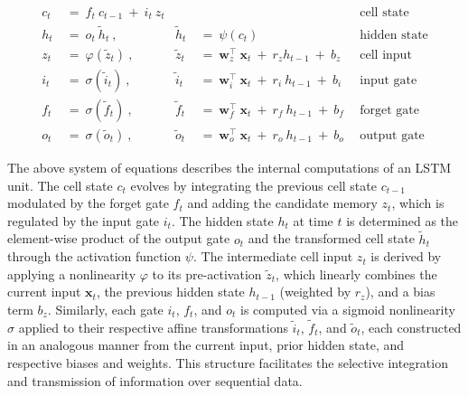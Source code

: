 \begin{align}
c_t \ &= \  f_t \ c_{t-1} \ + \ i_t \ z_t &  & &\text{cell state} \\
h_t  \ &= \ o_t \ \tilde{h}_t \ , & \tilde{h}_t \ &= \ \psi \left( c_t\right)
  &\text{hidden state} \\
z_t \ &= \ \varphi \left( \tilde{z}_t \right) \ , 
  &\tilde{z}_t \ &=  \ \mathbf{w}^\top_{z} \ \mathbf{x}_t \ + \
  r_{z}  h_{t-1} \ + \  b_{z} \ \
  &\text{cell input} \\
i_t \ &= \ \sigma \left( \tilde{i}_t  \right) \ , 
  &\tilde{i}_t \ &= \ \mathbf{w}^\top_{i} \ \mathbf{x}_t \ + \
  r_{i}  \ h_{t-1} \ + \  b_{i} \ \
  &\text{input gate} \\
f_t \ &= \ \sigma \left(  \tilde{f}_t \right) \ , 
  &\tilde{f}_t \ &= \ \mathbf{w}^\top_{f} \ \mathbf{x}_t  \ + \
  r_{f}  \ h_{t-1} \ + \  b_{f} \ \
  &\text{forget gate} \\
o_t \ &= \ \sigma \left( \tilde{o}_t \right) \ , 
  &\tilde{o}_t  \ &= \ \mathbf{w}^\top_{o} \ \mathbf{x}_t \ + \
  r_{o}  \ h_{t-1} \ + \  b_{o} \ \
  &\text{output gate} 
\end{align}

The above system of equations describes the internal computations of an LSTM unit. The cell state $c_t$ evolves by integrating the previous cell state $c_{t-1}$ modulated by the forget gate $f_t$ and adding the candidate memory $z_t$, which is regulated by the input gate $i_t$. The hidden state $h_t$ at time $t$ is determined as the element-wise product of the output gate $o_t$ and the transformed cell state $\tilde{h}_t$ through the activation function $\psi$. The intermediate cell input $z_t$ is derived by applying a nonlinearity $\varphi$ to its pre-activation $\tilde{z}_t$, which linearly combines the current input $\mathbf{x}_t$, the previous hidden state $h_{t-1}$ (weighted by $r_z$), and a bias term $b_z$. Similarly, each gate $i_t$, $f_t$, and $o_t$ is computed via a sigmoid nonlinearity $\sigma$ applied to their respective affine transformations $\tilde{i}_t$, $\tilde{f}_t$, and $\tilde{o}_t$, each constructed in an analogous manner from the current input, prior hidden state, and respective biases and weights. This structure facilitates the selective integration and transmission of information over sequential data.


